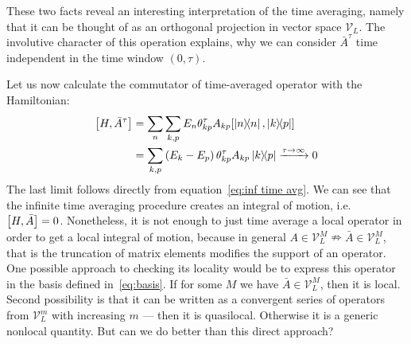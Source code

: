 These two facts reveal an interesting interpretation of the time averaging, namely that it can be
thought of as an orthogonal projection in vector space \(\mathcal{V}_L\). The involutive character of this operation explains,
why we can consider \(\bar{A}^{\tau}\) time independent in the time window \(\left(0,\tau\right)\).

Let us now calculate the commutator of time-averaged operator with the Hamiltonian:
\begin{align}
  \comm{H}{\bar{A}^{\tau}} & = \sum_n \sum_{k,p} E_n \theta_{kp}^{\tau} A_{kp} \comm{ \ketbra{n}{n}}{ \ketbra{k}{p}} \nonumber         \\
                           & = \sum_{k,p} \left(E_k-E_p\right) \theta_{kp}^{\tau} A_{kp} \ketbra{k}{p} \xrightarrow{\tau \to \infty} 0
\end{align}
The last limit follows directly from equation~\eqref{eq:inf time avg}. We can see that the infinite time averaging procedure
creates an integral of motion, i.e. \(\comm{H}{\bar{A}} = 0\). Nonetheless, it is not enough to just time average a
local operator in order to get a local integral of motion, because in general \(A\in \mathcal{V}_L^M  \nRightarrow \bar{A} 
\in \mathcal{V}_L^M\), that is the truncation of matrix elements modifies the support of an operator.
One possible approach to checking its locality would be to
express this operator in the basis defined in~\eqref{eq:basis}. If for some \(M\) we have \(\bar{A}\in \mathcal{V}_L^M\),
then it is local. Second possibility is that it can be written as a convergent series of operators from \(\mathcal{V}_L^m\) with
increasing \(m\) --- then it is quasilocal. Otherwise it is a generic nonlocal quantity. But can we do better than this
direct approach?

